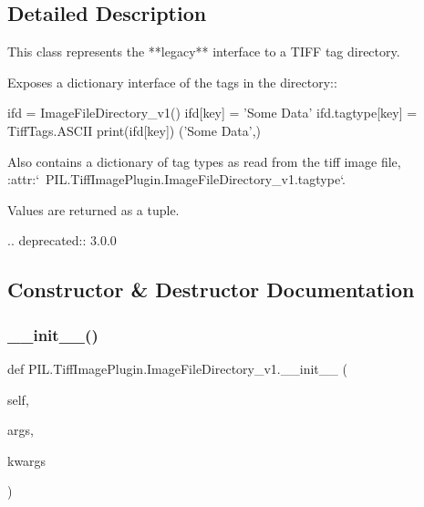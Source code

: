 \subsection{Detailed Description}
\begin{DoxyVerb}This class represents the **legacy** interface to a TIFF tag directory.

Exposes a dictionary interface of the tags in the directory::

    ifd = ImageFileDirectory_v1()
    ifd[key] = 'Some Data'
    ifd.tagtype[key] = TiffTags.ASCII
    print(ifd[key])
    ('Some Data',)

Also contains a dictionary of tag types as read from the tiff image file,
:attr:`~PIL.TiffImagePlugin.ImageFileDirectory_v1.tagtype`.

Values are returned as a tuple.

..  deprecated:: 3.0.0
\end{DoxyVerb}
 

\subsection{Constructor \& Destructor Documentation}
\mbox{\label{classPIL_1_1TiffImagePlugin_1_1ImageFileDirectory__v1_a9be3897477790918096954417321566d}} 
\subsubsection{\texorpdfstring{\+\_\+\+\_\+init\+\_\+\+\_\+()}{\_\_init\_\_()}}
{\footnotesize\ttfamily def P\+I\+L.\+Tiff\+Image\+Plugin.\+Image\+File\+Directory\+\_\+v1.\+\_\+\+\_\+init\+\_\+\+\_\+ (\begin{DoxyParamCaption}\item[{}]{self,  }\item[{}]{args,  }\item[{}]{kwargs }\end{DoxyParamCaption})}



